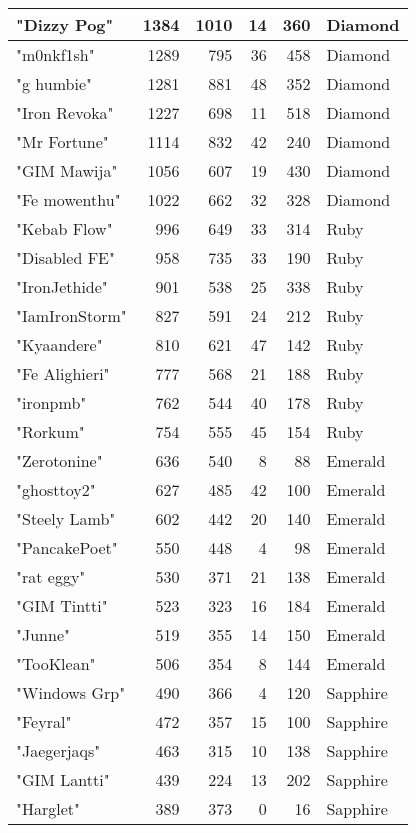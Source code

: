 \documentclass{article}
\begin{document}
\begin{table}[htbp]
\begin{tabular}{|l|r|r|r|r|l|}
"Dizzy Pog" & 1384 & 1010 & 14 & 360 & Diamond \\ \hline
"m0nkf1sh" & 1289 & 795 & 36 & 458 & Diamond \\ \hline
"g humbie" & 1281 & 881 & 48 & 352 & Diamond \\ \hline
"Iron Revoka" & 1227 & 698 & 11 & 518 & Diamond \\ \hline
"Mr Fortune" & 1114 & 832 & 42 & 240 & Diamond \\ \hline
"GIM Mawija" & 1056 & 607 & 19 & 430 & Diamond \\ \hline
"Fe mowenthu" & 1022 & 662 & 32 & 328 & Diamond \\ \hline
"Kebab Flow" & 996 & 649 & 33 & 314 & Ruby \\ \hline
"Disabled FE" & 958 & 735 & 33 & 190 & Ruby \\ \hline
"IronJethide" & 901 & 538 & 25 & 338 & Ruby \\ \hline
"IamIronStorm" & 827 & 591 & 24 & 212 & Ruby \\ \hline
"Kyaandere" & 810 & 621 & 47 & 142 & Ruby \\ \hline
"Fe Alighieri" & 777 & 568 & 21 & 188 & Ruby \\ \hline
"ironpmb" & 762 & 544 & 40 & 178 & Ruby \\ \hline
"Rorkum" & 754 & 555 & 45 & 154 & Ruby \\ \hline
"Zerotonine" & 636 & 540 & 8 & 88 & Emerald \\ \hline
"ghosttoy2" & 627 & 485 & 42 & 100 & Emerald \\ \hline
"Steely Lamb" & 602 & 442 & 20 & 140 & Emerald \\ \hline
"PancakePoet" & 550 & 448 & 4 & 98 & Emerald \\ \hline
"rat eggy" & 530 & 371 & 21 & 138 & Emerald \\ \hline
"GIM Tintti" & 523 & 323 & 16 & 184 & Emerald \\ \hline
"Junne" & 519 & 355 & 14 & 150 & Emerald \\ \hline
"TooKlean" & 506 & 354 & 8 & 144 & Emerald \\ \hline
"Windows Grp" & 490 & 366 & 4 & 120 & Sapphire \\ \hline
"Feyral" & 472 & 357 & 15 & 100 & Sapphire \\ \hline
"Jaegerjaqs" & 463 & 315 & 10 & 138 & Sapphire \\ \hline
"GIM Lantti" & 439 & 224 & 13 & 202 & Sapphire \\ \hline
"Harglet" & 389 & 373 & 0 & 16 & Sapphire \\ \hline

\end{tabular}
\end{table}
\end{document}
